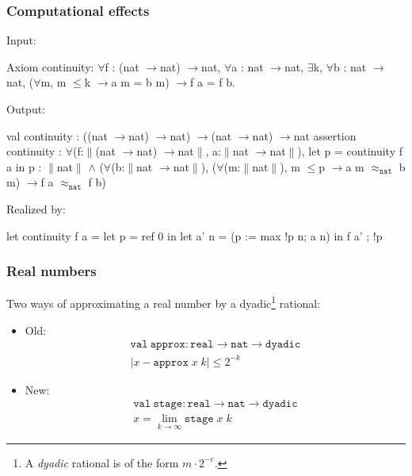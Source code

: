 \documentclass[compress,t]{beamer}
\newcommand{\iTo}{{\ensuremath{\to}}}
\newcommand{\iForall}{$\forall$}
\newcommand{\iAnd}{$\land$}
\newcommand{\iExists}{$\exists$}
\newcommand{\iT}[1]{$\|$#1$\|$}
\newcommand{\iPer}[1]{$\approx_{\mathtt{#1}}$}
\newcommand{\iLeq}{$\leq$}
\begin{document}
\begin{frame}[fragile]
  \frametitle{Computational effects}

Input:
%
\begin{sourcex}
Axiom continuity:
  \iForall f : (nat \iTo nat) \iTo nat, \iForall a : nat \iTo nat,
  \iExists k, \iForall b : nat \iTo nat,
    (\iForall m, m \iLeq k \iTo a m = b m) \iTo f a = f b.
\end{sourcex}

Output:
%
\begin{sourcex}
val continuity : ((nat \iTo nat) \iTo nat) \iTo (nat \iTo nat) \iTo nat
assertion continuity :
  \iForall (f:\iT{(nat \iTo nat) \iTo nat}, a:\iT{nat \iTo nat}),
    let p = continuity f a in p : \iT{nat} \iAnd
    (\iForall (b:\iT{nat \iTo nat}),
       (\iForall (m:\iT{nat}),  m \iLeq p \iTo a m \iPer{nat} b m) \iTo f a \iPer{nat} f b)
\end{sourcex}

\pause

Realized by:
%
\begin{sourcex}
let continuity f a =
  let p = ref 0 in
  let a' n = (p := max !p n; a n) in
    f a' ; !p
\end{sourcex}
\end{frame}

\begin{frame}
  \frametitle{Real numbers}

  Two ways of approximating a real number by a dyadic\footnote{A
    \emph{dyadic} rational is of the form $m \cdot 2^{-e}$.} rational:
  \begin{itemize}
  \item<1-> Old:
    \begin{gather*}
      \mathtt{val\ approx : real \to nat \to dyadic}\\
      |x - \mathtt{approx}\;x\;k| \leq 2^{-k}
    \end{gather*}
  \item<2-> New:
    \begin{gather*}
      \mathtt{val\ stage : real \to nat \to dyadic}\\
      x = \lim_{k \to \infty} \mathtt{stage}\;x\;k
    \end{gather*}
  \end{itemize}
\end{frame}
\end{document}
